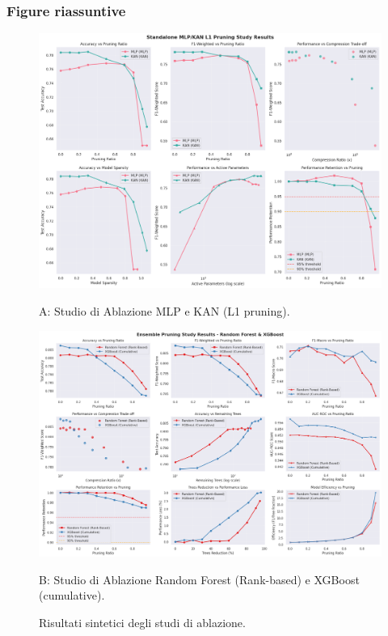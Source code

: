 \documentclass[a4paper,12pt]{report}
\begin{document}
	\subsubsection{Figure riassuntive}
	\begin{figure}[H]
		\centering
		\begin{minipage}{0.49\textwidth}
			\centering
			\includegraphics[width=\linewidth]{img/abl_kanvsmlp_pm.png}
			\caption*{A: Studio di Ablazione MLP e KAN (L1 pruning).}
		\end{minipage}\hfill
		\begin{minipage}{0.49\textwidth}
			\centering
			\includegraphics[width=\linewidth]{img/abl_xgbvsrf_pm.png}
			\caption*{B: Studio di Ablazione Random Forest (Rank-based) e XGBoost (cumulative).}
		\end{minipage}
		\caption{Risultati sintetici degli studi di ablazione.}
	\end{figure}
	
\end{document}
